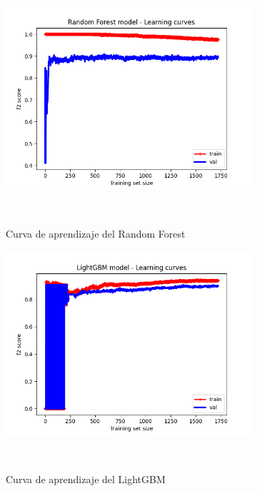\begin{figure}[!ht]
\begin{subfigure}[b]{0.3\textwidth}
        \includegraphics[width=\linewidth]{media/images/learning-curves/rf.png}
        \caption{Curva de aprendizaje del Random Forest}\ \label{sfig:lc-rf}
    \end{subfigure}
    \begin{subfigure}[b]{0.3\textwidth}
        \includegraphics[width=\linewidth]{media/images/learning-curves/lgbm.png}
        \caption{Curva de aprendizaje del LightGBM}\ \label{sfig:lc-lgbm}
    \end{subfigure}
    \begin{subfigure}[b]{0.3\textwidth}

\end{subfigure}
\end{figure}
